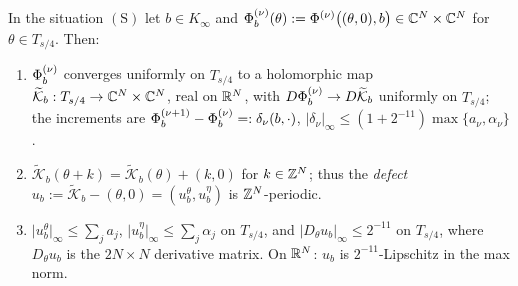 \begin{proposition}\label{bpP:p11a:limit-map}
In the situation $(\mathrm S)$ let $b\in K_\infty$ and $\Phi^{(\nu)}_b(\theta):=\Phi^{(\nu)}\bigl((\theta,0),b\bigr)\in\mathbb{C}^N\times\mathbb{C}^N$ for $\theta\in T_{s/4}$. Then:
\begin{enumerate}[label=(\alph*)]
\item $\Phi^{(\nu)}_b$ converges uniformly on $T_{s/4}$ to a holomorphic map $\widetilde{\mathcal K}_b:T_{s/4}\to\mathbb{C}^N\times\mathbb{C}^N$, real on $\mathbb{R}^N$, with $D\Phi^{(\nu)}_b\to D\widetilde{\mathcal K}_b$ uniformly on $T_{s/4}$; the increments are $\Phi^{(\nu+1)}_b-\Phi^{(\nu)}_b=:\delta_\nu(b,\cdot)$, $\lvert\delta_\nu\rvert_\infty\le(1+2^{-11})\max\{a_\nu,\alpha_\nu\}$.
\item $\widetilde{\mathcal K}_b(\theta+k)=\widetilde{\mathcal K}_b(\theta)+(k,0)$ for $k\in\mathbb{Z}^N$; thus the \emph{defect} $u_b:=\widetilde{\mathcal K}_b-(\theta,0)=(u^\theta_b,u^\eta_b)$ is $\mathbb{Z}^N$-periodic.
\item $\lvert u^\theta_b\rvert_\infty\le\sum_ja_j$, $\lvert u^\eta_b\rvert_\infty\le\sum_j\alpha_j$ on $T_{s/4}$, and $\lvert D_\theta u_b\rvert_\infty\le2^{-11}$ on $T_{s/4}$, where $D_\theta u_b$ is the $2N\times N$ derivative matrix. On $\mathbb{R}^N$: $u_b$ is $2^{-11}$-Lipschitz in the max norm.
\end{enumerate}
\end{proposition}
